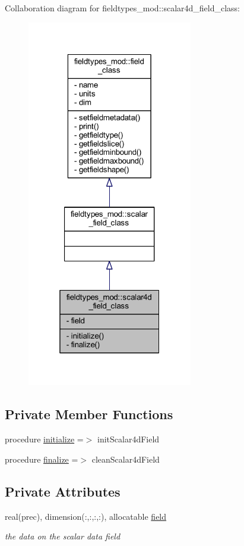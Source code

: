 Collaboration diagram for fieldtypes\+\_\+mod\+:\+:scalar4d\+\_\+field\+\_\+class\+:\nopagebreak
\begin{figure}[H]
\begin{center}
\leavevmode
\includegraphics[width=205pt]{structfieldtypes__mod_1_1scalar4d__field__class__coll__graph}
\end{center}
\end{figure}
\subsection*{Private Member Functions}
\begin{DoxyCompactItemize}
\item 
procedure \mbox{\hyperlink{structfieldtypes__mod_1_1scalar4d__field__class_a0ce4946e3ff5282539ae851e451e3b9c}{initialize}} =$>$ init\+Scalar4d\+Field
\item 
procedure \mbox{\hyperlink{structfieldtypes__mod_1_1scalar4d__field__class_ab244331eb650625ca1b6b45a62e3643b}{finalize}} =$>$ clean\+Scalar4d\+Field
\end{DoxyCompactItemize}
\subsection*{Private Attributes}
\begin{DoxyCompactItemize}
\item 
real(prec), dimension(\+:,\+:,\+:,\+:), allocatable \mbox{\hyperlink{structfieldtypes__mod_1_1scalar4d__field__class_aa0022774a139bc2d79c23fce42ab167a}{field}}
\begin{DoxyCompactList}\small\item\em the data on the scalar data field \end{DoxyCompactList}\end{DoxyCompactItemize}


